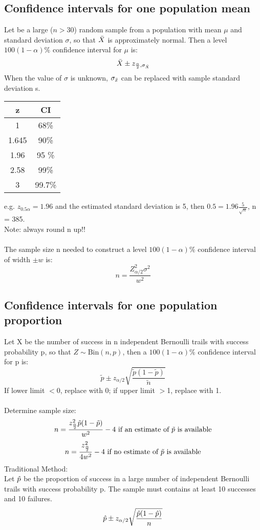 \documentclass[../main.tex]{subfiles}
\begin{document}
\subsection{Confidence intervals for one population mean}
Let \xotn be a large ($n>30$) random sample from a population with mean $\mu$ and standard deviation $\sigma$, so that $\bar{X}$ is approximately normal. Then a level $100(1-\alpha)\%$ confidence interval for $\mu$ is: 
\begin{equation*}
     \bar{X} \pm z_{\frac{\alpha}{2} , \sigma_{\bar{X}}}
\end{equation*}
When the value of $\sigma$ is unknown, $\sigma_{\bar{x}}$ can be replaced with sample standard deviation s.\\
\begin{center}
\begin{tabular}{ |c|c| } 
 \hline
 z & CI \\ 
 \hline
 1 & 68\% \\ 
 1.645 & 90\% \\ 
 1.96 & 95 \% \\
 2.58 & 99\% \\
 3 & 99.7\% \\
 \hline
\end{tabular}
\end{center}
e.g. $z_{0.5\alpha}=1.96$ and the estimated standard deviation is 5, then $0.5 = 1.96 \frac{5}{\sqrt{n}}$, n = 385.\\
Note: always round n up!!\\
\\
The sample size n needed to construct a level $100(1-\alpha)\%$ confidence interval of width $\pm w$ is:
\[
n=\frac{Z_{\alpha / 2}^2\sigma^2}{w^2}
\]


\subsection{Confidence intervals for one population proportion}
Let X be the number of success in n independent Bernoulli trails with success probability p, so that $Z\sim \mbox{Bin}(n,p)$, then a $100(1-\alpha)\%$ confidence interval for p is:
\[\tilde{p}\pm z_{{\alpha}/{2}}\sqrt{\frac{\tilde{p}(1-\tilde{p})}{\tilde{n}}}
\]
If lower limit $<$0, replace with 0; if upper limit $>$1, replace with 1.\\
\\
Determine sample size:
\[n=\frac{z_{\frac{\alpha}{2}}^2 \tilde{p}(1-\tilde{p})}{w^2}-4 \mbox{ if an estimate of } \tilde{p}\mbox{ is available}\]
\[n=\frac{z_{\frac{\alpha}{2}}^2 }{4w^2}-4 \mbox{ if no estimate of } \tilde{p}\mbox{ is available}\]
Traditional Method:\\
Let $\hat{p}$ be the proportion of success in a large number of independent Bernoulli trails with success probability p.
The sample must contains at least 10 successes and 10 failures.\\
\[\hat{p}\pm z_{{\alpha}/{2}}\sqrt{\frac{\hat{p}(1-\hat{p})}{n}}
\]
\end{document}
